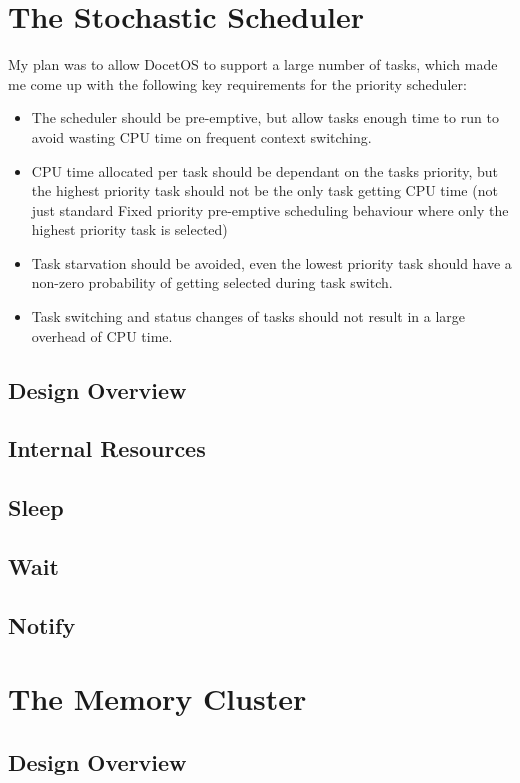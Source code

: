 \documentclass[12pt,a4paper]{article}
\begin{document}
\section{The Stochastic Scheduler}
My plan was to allow DocetOS to support a large number of tasks, which made me come up with the following key requirements for the priority scheduler:
\begin{itemize}
  \item The scheduler should be pre-emptive, but allow tasks enough time to run to avoid wasting CPU time on frequent context switching.
  \item CPU time allocated per task should be dependant on the tasks priority, but the highest priority task should not be the only task getting CPU time (not just standard Fixed priority pre-emptive scheduling behaviour where only the highest priority task is selected)
  \item Task starvation should be avoided, even the lowest priority task should have a non-zero probability of getting selected during task switch.
  \item Task switching and status changes of tasks should not result in a large overhead of CPU time.
\end{itemize}
\subsection{Design Overview}
\subsection{Internal Resources}
\subsection{Sleep}
\subsection{Wait}
\subsection{Notify}

\section{The Memory Cluster}
\subsection{Design Overview}
\end{document}
